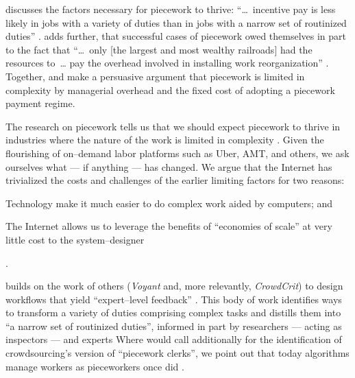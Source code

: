 \documentclass[trackingWork]{subfiles}
\begin{document}
\citeauthor{Brown01041990} discusses the factors necessary for piecework to thrive:
    ``\dots~incentive pay is less likely in jobs with
    a variety of duties than in jobs with a narrow set of routinized duties''
\cite{Brown01041990}.
\citeauthor{10.2307/23702539} adds further, that
successful cases of piecework owed themselves in part to the fact that
    ``\dots~only [the largest and most wealthy railroads] had the resources to~\dots
    pay the overhead involved in installing work reorganization''
\cite{10.2307/23702539}.
Together, \citeauthor{10.2307/23702539} and \citeauthor{Brown01041990}
make a persuasive argument that piecework is limited in complexity by
managerial overhead and the fixed cost of adopting a piecework payment regime.


\subsubsubsection{\whatchanged}
The research on piecework tells us that
we should expect piecework to thrive in industries where
the nature of the work is limited in complexity
\cite{Brown01041990}.
Given the flourishing of on--demand labor platforms such as
Uber, AMT, and others, we ask ourselves
what --- if anything --- has changed.
We argue that
the Internet has trivialized
the costs and challenges of the earlier limiting factors for two reasons:
\begin{inlinelist}
  \item Technology make it much easier to do complex work aided by computers; and %
  \item The Internet allows us to leverage the benefits of
        ``economies of scale'' at very little cost
        to the system--designer \cite{lessig2006code,miller2011understanding}
\end{inlinelist}.

\citeauthor{yuanAlmost} builds on the work of others
(\textit{Voyant} and, more relevantly, \textit{CrowdCrit})
to design workflows that yield ``expert--level feedback''
\cite{yuanAlmost,Xu:2014:VGS:2531602.2531604,Luther:2014:CCA:2556420.2556788}.
This body of work identifies ways to transform a variety of duties comprising complex tasks
and distills them into ``a narrow set of routinized duties'',
informed in part by researchers --- acting as inspectors --- and experts
\cite[quotations from][]{10.2307/23702539}
Where \citeauthor{10.2307/23702539} would call additionally for the identification of
crowdsourcing's version of ``piecework clerks'', we point out that
today algorithms manage workers as pieceworkers once did
\cite{uberAlgorithm,10.2307/23702539}.
\end{document}
